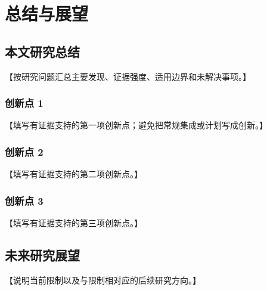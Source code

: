 \chapter{总结与展望}

\section{本文研究总结}

【按研究问题汇总主要发现、证据强度、适用边界和未解决事项。】

\subsection{创新点 1}

【填写有证据支持的第一项创新点；避免把常规集成或计划写成创新。】

\subsection{创新点 2}

【填写有证据支持的第二项创新点。】

\subsection{创新点 3}

【填写有证据支持的第三项创新点。】

\section{未来研究展望}

【说明当前限制以及与限制相对应的后续研究方向。】
